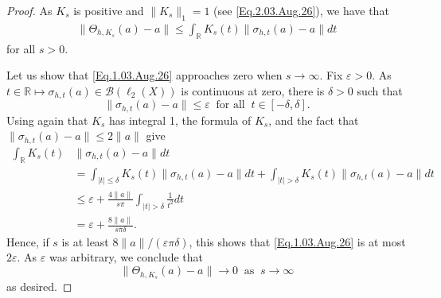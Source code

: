 \documentclass[11pt]{amsart}
\newcommand{\R}{\mathbb{R}}
\newcommand{\B}{\mathcal{B}}
\newcommand{\eps}{\varepsilon}
\numberwithin{equation}{section}
\theoremstyle{definition}
\theoremstyle{remark}
\begin{document}
\begin{proof}
As $K_s$ is positive and $\|K_s\|_1=1$  (see \eqref{Eq.2.03.Aug.26}), we have that
\begin{align}\label{Eq.1.03.Aug.26}\|\Theta_{h,K_s}(a)-a\|
\leq \int_\R K_s(t)\|\sigma_{h,t}(a)-a\|dt
\end{align}
for all $s>0$.

Let us show that \eqref{Eq.1.03.Aug.26} approaches zero when $s\to \infty$. Fix $\eps>0$. As $t\in \R\mapsto \sigma_{h,t}(a)\in \B(\ell_2(X))$ is continuous at zero, there is $\delta>0$ such that
\[\|\sigma_{h,t}(a)-a\|\leq \eps\ \text{ for all }\ t\in [-\delta,\delta].\]
Using again that $K_s$ has integral 1,   the formula of $K_s$, and the fact that  $\|\sigma_{h,t}(a)-a\|\leq 2\|a\|$  give
\begin{align*}
    \int_\R K_s(t) & \|\sigma_{h,t}(a)-a\|dt \\
    &=\int_{|t|\leq \delta} K_s(t)\|\sigma_{h,t}(a)-a\|dt+\int_{|t|>\delta} K_s(t)\|\sigma_{h,t}(a)-a\|dt
\\
&\leq \eps+\frac{4\|a\|}{s \pi}\int_{|t|>\delta}\frac{1}{t^2}dt  \\
&=\eps+\frac{8\|a\|}{s \pi \delta}.
\end{align*}
Hence, if $s$ is at least ${8\|a\|}/({\eps\pi \delta})$, this shows that \eqref{Eq.1.03.Aug.26} is at most $2\eps$. As $\eps$ was arbitrary,  we conclude that
\[\|\Theta_{h,K_s}(a)-a\|\to 0\ \text{ as } \ s\to \infty\]
    as desired.
\end{proof}
\end{document}
